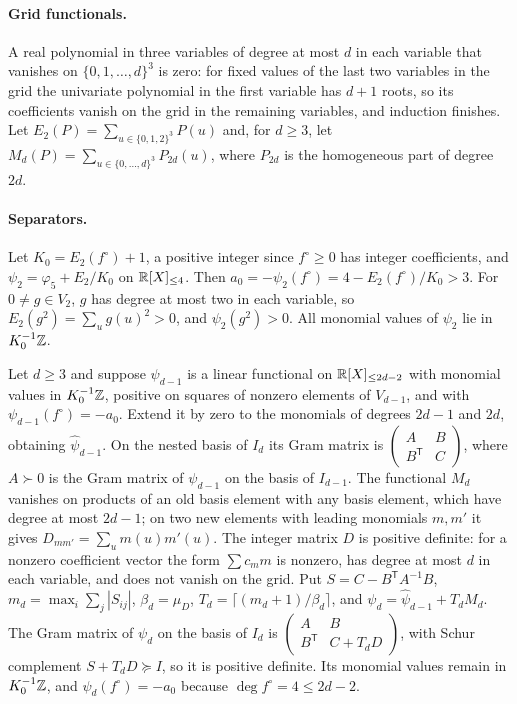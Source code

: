 \paragraph{Grid functionals.}
A real polynomial in three variables of degree at most $d$ in each variable
that vanishes on $\{0,1,\ldots,d\}^3$ is zero: for fixed values of the last
two variables in the grid the univariate polynomial in the first variable has
$d+1$ roots, so its coefficients vanish on the grid in the remaining variables,
and induction finishes. Let $E_2(P)=\sum_{u\in\{0,1,2\}^3}P(u)$ and, for
$d\ge3$, let $M_d(P)=\sum_{u\in\{0,\ldots,d\}^3}P_{2d}(u)$, where $P_{2d}$ is
the homogeneous part of degree $2d$.

\paragraph{Separators.}
Let $K_0=E_2(f^\circ)+1$, a positive integer since $f^\circ\ge0$ has integer
coefficients, and
$\psi_2=\varphi_5+E_2/K_0$ on $\mathbb R[X]_{\le4}$. Then
$a_0=-\psi_2(f^\circ)=4-E_2(f^\circ)/K_0>3$. For $0\ne g\in V_2$, $g$ has
degree at most two in each variable, so $E_2(g^2)=\sum_ug(u)^2>0$, and
$\psi_2(g^2)>0$. All monomial values of $\psi_2$ lie in $K_0^{-1}\mathbb Z$.

Let $d\ge3$ and suppose $\psi_{d-1}$ is a linear functional on
$\mathbb R[X]_{\le2d-2}$ with monomial values in $K_0^{-1}\mathbb Z$, positive on squares
of nonzero elements of $V_{d-1}$, and with $\psi_{d-1}(f^\circ)=-a_0$. Extend
it by zero to the monomials of degrees $2d-1$ and $2d$, obtaining
$\hat\psi_{d-1}$. On the nested basis of $I_d$ its Gram matrix is
$\left(\begin{smallmatrix}A&B\\B^{\mathsf T}&C\end{smallmatrix}\right)$, where
$A\succ0$ is the Gram matrix of $\psi_{d-1}$ on the basis of $I_{d-1}$. The
functional $M_d$ vanishes on products of an old basis element with any basis
element, which have degree at most $2d-1$; on two new elements with leading
monomials $m,m'$ it gives
$D_{mm'}=\sum_um(u)m'(u)$. The integer matrix $D$ is positive definite: for a
nonzero coefficient vector the form $\sum c_mm$ is nonzero, has degree at most
$d$ in each variable, and does not vanish on the grid. Put
$S=C-B^{\mathsf T}A^{-1}B$, $m_d=\max_i\sum_j|S_{ij}|$,
$\beta_d=\mu_D$, $T_d=\lceil(m_d+1)/\beta_d\rceil$, and
$\psi_d=\hat\psi_{d-1}+T_dM_d$. The Gram matrix of $\psi_d$ on the basis of
$I_d$ is $\left(\begin{smallmatrix}A&B\\B^{\mathsf T}&C+T_dD\end{smallmatrix}\right)$,
with Schur complement $S+T_dD\succeq I$, so it is positive definite. Its
monomial values remain in $K_0^{-1}\mathbb Z$, and $\psi_d(f^\circ)=-a_0$ because
$\deg f^\circ=4\le2d-2$.

